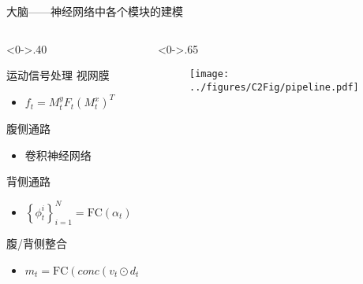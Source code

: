 \begin{frame}{大脑——神经网络中各个模块的建模}
	\begin{columns}[T] %
		\begin{column}<0->{.40\textwidth}
			\begin{block}{运动信号处理}
				视网膜
				\begin{itemize}
					\item<0-> $ f_t = M_t^y F_t (M_t^x)^T $
				\end{itemize}
				
				腹侧通路
				\begin{itemize}
					\item<0-> 卷积神经网络
				\end{itemize}
				
				背侧通路
				\begin{itemize}
					\item<0-> $ \left\{ \phi _t ^i \right\}_{i=1}^N = \text{FC}(\alpha_t) $
				\end{itemize}
				
				腹/背侧整合
				\begin{itemize}
					\item<0-> $ m_t = \text{FC}(conc(v_t \odot d_t)) $
				\end{itemize}
			\end{block}
			
		\end{column}
		\hfill%
		
		\begin{column}<0->{.65\textwidth}
			\begin{figure}[!t]
				\centering
				\texttt{[image: ../figures/C2Fig/pipeline.pdf]}
			\end{figure}
		\end{column}%
	\end{columns}
	
\end{frame}


